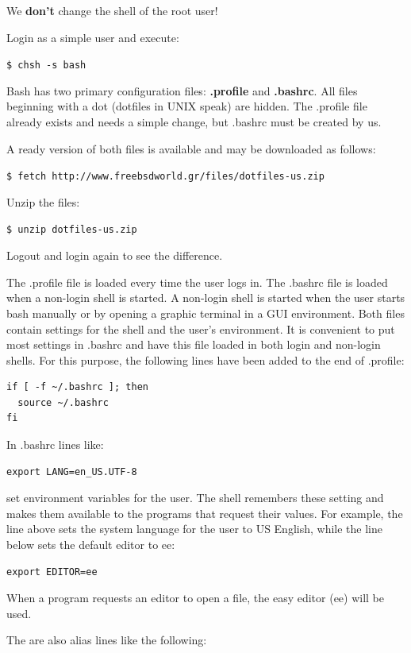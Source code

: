 \documentclass[a4paper,twoside,12pt]{article}
\newcommand{\codeuser}[1]{\texttt{\$ #1}}
\begin{document}
We \textbf{don't} change the shell of the root user!

Login as a simple user and execute:

\codeuser{chsh -s bash}

Bash has two primary configuration files: \textbf{.profile} and \textbf{.bashrc}. All files beginning with a dot (dotfiles in UNIX speak) are hidden. The .profile file already exists and needs a simple change, but .bashrc must be created by us.

A ready version of both files is available and may be downloaded as follows:

\codeuser{fetch http://www.freebsdworld.gr/files/dotfiles-us.zip}

Unzip the files:

\codeuser{unzip dotfiles-us.zip}

Logout and login again to see the difference.

The .profile file is loaded every time the user logs in. The .bashrc file is loaded when a non-login shell is started. A non-login shell is started when the user starts bash manually or by opening a graphic terminal in a GUI environment. Both files contain settings for the shell and the user's environment. It is convenient to put most settings in .bashrc and have this file loaded in both login and non-login shells. For this purpose, the following lines have been added to the end of .profile:

\begin{verbatim}
if [ -f ~/.bashrc ]; then
  source ~/.bashrc
fi
\end{verbatim}

In .bashrc lines like:

\begin{verbatim}
export LANG=en_US.UTF-8
\end{verbatim}

set environment variables for the user. The shell remembers these setting and makes them available to the programs that request their values. For example, the line above sets the system language for the user to US English, while the line below sets the default editor to ee:

\begin{verbatim}
export EDITOR=ee
\end{verbatim}

When a program requests an editor to open a file, the easy editor (ee) will be used.

The are also alias lines like the following:
\end{document}
